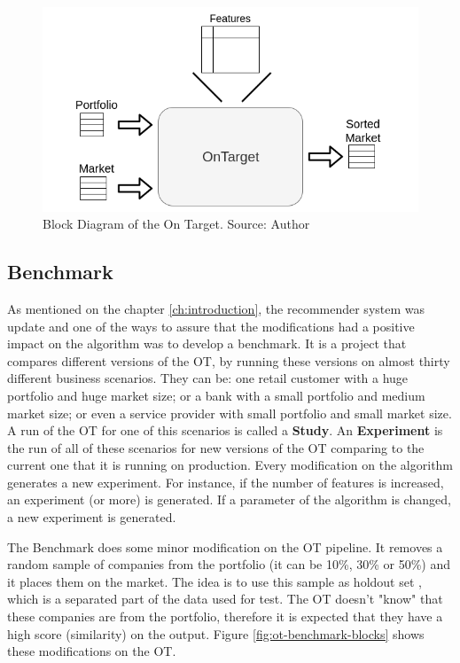 \begin{figure}[h]
   \centering
   \includegraphics[width=\linewidth]{fig/ch3-ot-blocks.png}
   \caption{Block Diagram of the On Target. Source: Author}
   \label{fig:ot-blocks}
\end{figure}

\subsection{Benchmark}

As mentioned on the chapter \ref{ch:introduction}, the recommender system was update and one of the ways to assure that the modifications had a positive impact on the algorithm was to develop a benchmark. It is a project that compares different versions of the OT, by running these versions on almost thirty different business scenarios. They can be: one retail customer with a huge portfolio and huge market size; or a bank with a small portfolio and medium market size; or even a service provider with small portfolio and small market size. A run of the OT for one of this scenarios is called a \textbf{Study}. An \textbf{Experiment} is the run of all of these scenarios for new versions of the OT comparing to the current one that it is running on production. Every modification on the algorithm generates a new experiment. For instance, if the number of features is increased, an experiment (or more) is generated. If a parameter of the algorithm is changed, a new experiment is generated.

The Benchmark does some minor modification on the OT pipeline. It removes a random sample of companies from the portfolio (it can be 10\%, 30\% or 50\%) and it places them on the market. The idea is to use this sample as holdout set \cite{kohavi2001}, which is a separated part of the data used for test. The OT doesn't "know" that these companies are from the portfolio, therefore it is expected that they have a high score (similarity) on the output. Figure \ref{fig:ot-benchmark-blocks} shows these modifications on the OT.

